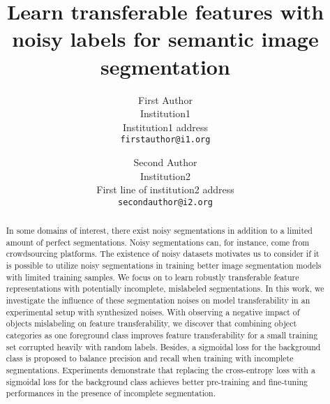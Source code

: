 \documentclass[10pt,twocolumn,letterpaper]{article}
\begin{document}
\onecolumn
{}


\twocolumn
{}
\newpage
\title{Learn transferable features with noisy labels for semantic image segmentation}

\author{First Author\\
Institution1\\
Institution1 address\\
{\tt\small firstauthor@i1.org}
\and
Second Author\\
Institution2\\
First line of institution2 address\\
{\tt\small secondauthor@i2.org}
}

\maketitle


\begin{abstract}


In some domains of interest, there exist noisy segmentations in addition to a limited amount of perfect segmentations.
Noisy segmentations can, for instance, come from crowdsourcing platforms.
The existence of noisy datasets motivates us to consider if it is possible to utilize noisy segmentations in training better image segmentation models with limited training samples.
We focus on to learn robustly transferable feature representations with potentially incomplete, mislabeled segmentations.
In this work, we investigate the influence of these segmentation noises on model transferability in an experimental setup with synthesized noises.
With observing a negative impact of objects mislabeling on feature transferability, we discover that combining object categories as one foreground class improves feature transferability for a small training set corrupted heavily with random labels.
Besides, a sigmoidal loss for the background class is proposed to balance precision and recall when training with incomplete segmentations.
Experiments demonstrate that replacing the cross-entropy loss with a sigmoidal loss for the background class achieves better pre-training and fine-tuning performances in the presence of incomplete segmentation.


\end{abstract}
\end{document}
